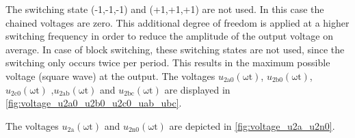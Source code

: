 \begin{solutionblock}
\begin{minipage}{0.55\textwidth}
    \end{minipage}
    \bigskip
    \FloatBarrier
    The switching state (-1,-1,-1) and (+1,+1,+1) are not used. In this case the chained voltages are zero. 
    This additional degree of freedom is applied at a higher switching frequency in order to reduce the amplitude of the
    output voltage on average. In case of block switching, these switching states are not used, since
    the switching only occurs twice per period. This results in the maximum possible voltage (square wave) at the output.
    The voltages $u_\mathrm{2a0}(\mathrm{\omega t})$, $u_\mathrm{2b0}(\mathrm{\omega t})$, $u_\mathrm{2c0}(\mathrm{\omega t})$
    ,$u_\mathrm{2ab}(\mathrm{\omega t})$ and $u_\mathrm{2bc}(\mathrm{\omega t})$ are displayed in \autoref{fig:voltage_u2a0_u2b0_u2c0_uab_ubc}.

    
    The voltages $u_\mathrm{2a}(\mathrm{\omega t})$ and $u_\mathrm{2n0}(\mathrm{\omega t})$ are depicted in \autoref{fig:voltage_u2a_u2n0}.

    

\end{solutionblock}

